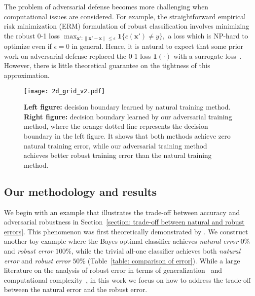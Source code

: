 \documentclass[11pt]{article}
\newcommand{\x}{\bm{x}}
\newcommand{\0}{\mathbf{0}}
\newcommand{\1}{\mathbf{1}}
\begin{document}
The problem of adversarial defense becomes more challenging when computational issues are considered. For example, the straightforward empirical risk minimization (ERM) formulation of robust classification involves minimizing the robust 0-1 loss
$
\max_{\x': \|\x'-\x\|\le\epsilon} \1\{c(\x')\not=y\},
$
a loss which is NP-hard to optimize even if $\epsilon = 0$ in general. Hence, it is natural to expect that some prior work on adversarial defense replaced the 0-1 loss $\1(\cdot)$ with a surrogate loss~\cite{madry2018towards,kurakin2016adversarial,pmlr-v80-uesato18a}. However, there is little theoretical guarantee on the tightness of this approximation. 





\begin{figure}
\centering
\texttt{[image: 2d\_grid\_v2.pdf]}
\caption{\textbf{Left figure:} decision boundary learned by natural training method. \textbf{Right figure:} decision boundary learned by our adversarial training method, where the orange dotted line represents the decision boundary in the left figure. It shows that both methods achieve zero natural training error, while our adversarial training method achieves better robust training error than the natural training method.}
\label{figure: intro}
\end{figure}

\subsection{Our methodology and results}

We begin with an example that illustrates the trade-off between accuracy and adversarial robustness in Section~\ref{section: trade-off between natural and robust errors}. This phenomenon was first theoretically demonstrated by \cite{tsipras2018robustness}. We construct another toy example where the Bayes optimal classifier achieves \emph{natural error} $0\%$ and \emph{robust error} $100\%$, while the trivial all-one classifier achieves both \emph{natural error} and \emph{robust error} $50\%$ (Table~\ref{table: comparison of error}). While a large literature on the analysis of robust error in terms of generalization~\cite{schmidt2018adversarially,NIPS2018_7307,yin2018rademacher} and computational complexity~\cite{bubeck2018adversarial1,bubeck2018adversarial2}, in this work we focus on how to address the trade-off between the natural error and the robust error.
\end{document}
